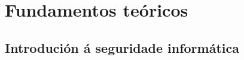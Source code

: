 %
%
\chapter[Fundamentos teóricos]{
	Fundamentos teóricos
	\label{ch.ids}
}

%
%
\section[Introdución á seguridade informática]{
	Introdución á seguridade informática}


